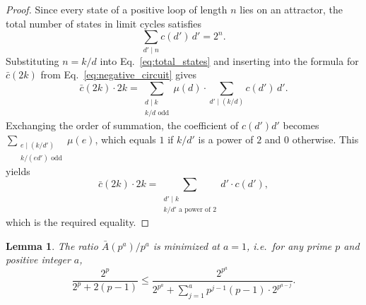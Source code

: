 \documentclass[11pt, reqno]{elsarticle}%
\theoremstyle{plain}
\newtheorem{lemma}[thm]{Lemma}
\begin{document}
\begin{proof}
    

Since every state of a positive loop of length 
$n$ lies on an attractor, the total number of states in limit 
cycles satisfies~\cite{demongeot2010number}
\begin{equation}
  \sum_{d'\mid n} c(d')\,d' = 2^n.
  \label{eq:total_states}
\end{equation}
Substituting $n = k/d$ into Eq.~\eqref{eq:total_states} and 
inserting into the formula for $\bar{c}(2k)$ from 
Eq.~\eqref{eq:negative_circuit} gives
\begin{equation}
  \bar{c}(2k)\cdot 2k = \sum_{\substack{d\mid k \\ 
  k/d \text{ odd}}}\mu(d)\cdot \sum_{d'\mid(k/d)}c(d')\,d'.
\end{equation}
Exchanging the order of summation, the coefficient of $c(d')d'$ 
becomes $\sum_{\substack{e \mid (k/d') \\ k/(ed') \text{ odd}}} 
\mu(e)$, which equals $1$ if $k/d'$ is a power of $2$ and $0$ 
otherwise. This yields
\begin{equation}
  \bar{c}(2k)\cdot 2k = \sum_{\substack{d'\mid k\\ 
  k/d' \text{ a power of }2}} d'\cdot c(d'),
\end{equation}
which is the required equality. 
\end{proof}

\begin{lemma}\label{lemma:primepowers}
The ratio 
$\bar{A}(p^a)/p^a$ is minimized at $a=1$, i.e.\ for any prime 
$p$ and positive integer $a$,
\begin{equation}
  \frac{2^p}{2^p + 2(p-1)} \leq \frac{2^{p^a}}{2^{p^a} + 
  \sum_{j=1}^{a} p^{j-1}(p-1)\cdot 2^{p^{a-j}}}.
\end{equation}
\end{lemma}
\end{document}
